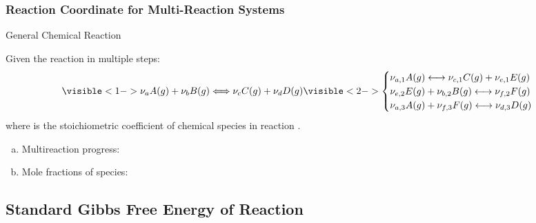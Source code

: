 \documentclass[10pt,compress,handout,unknownkeysallowed]{beamer}
\begin{document}
\begin{frame}
  \frametitle{Reaction Coordinate for Multi-Reaction Systems}
  \begin{block}{\begin{center}General Chemical Reaction\end{center}}
        Given the reaction in multiple steps:
        \begin{displaymath}
           \visible<1->{\nu_{a}A(g) + \nu_{b}B(g) \Longleftrightarrow \nu_{c}C(g) + \nu_{d}D(g)}\visible<2->{ \begin{cases}
               \nu_{a,1}A(g) \longleftrightarrow \nu_{c,1}C(g) + \nu_{e,1}E(g) & \\
               \nu_{e,2}E(g) + \nu_{b,2}B(g) \longleftrightarrow \nu_{f,2}F(g) & \\
               \nu_{a,3}A(g) + \nu_{f,3}F(g) \longleftrightarrow \nu_{d,3}D(g) & 
           \end{cases}}
         \end{displaymath} 
         where  is the stoichiometric coefficient of chemical species  in reaction .
  \end{block}
        \begin{enumerate}[a)]%
           \item<3-> Multireaction progress:
           \item<4-> Mole fractions of species:     
        \end{enumerate}
\end{frame}
\normalsize


\subsection{Standard Gibbs Free Energy of Reaction}
\end{document}
